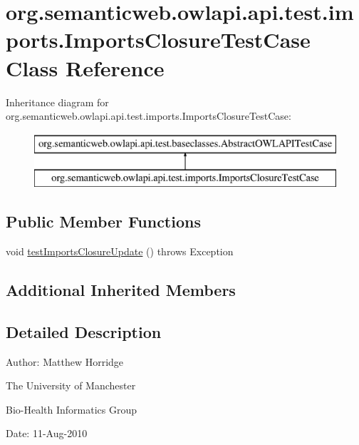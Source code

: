 \hypertarget{classorg_1_1semanticweb_1_1owlapi_1_1api_1_1test_1_1imports_1_1_imports_closure_test_case}{\section{org.\-semanticweb.\-owlapi.\-api.\-test.\-imports.\-Imports\-Closure\-Test\-Case Class Reference}
\label{classorg_1_1semanticweb_1_1owlapi_1_1api_1_1test_1_1imports_1_1_imports_closure_test_case}
}
Inheritance diagram for org.\-semanticweb.\-owlapi.\-api.\-test.\-imports.\-Imports\-Closure\-Test\-Case\-:\begin{figure}[H]
\begin{center}
\leavevmode
\includegraphics[height=2.000000cm]{classorg_1_1semanticweb_1_1owlapi_1_1api_1_1test_1_1imports_1_1_imports_closure_test_case}
\end{center}
\end{figure}
\subsection*{Public Member Functions}
\begin{DoxyCompactItemize}
\item 
void \hyperlink{classorg_1_1semanticweb_1_1owlapi_1_1api_1_1test_1_1imports_1_1_imports_closure_test_case_a5298f9a5603399f4a6b629d87a5d5fbf}{test\-Imports\-Closure\-Update} ()  throws Exception 
\end{DoxyCompactItemize}
\subsection*{Additional Inherited Members}


\subsection{Detailed Description}
Author\-: Matthew Horridge\par
 The University of Manchester\par
 Bio-\/\-Health Informatics Group\par
 Date\-: 11-\/\-Aug-\/2010 

